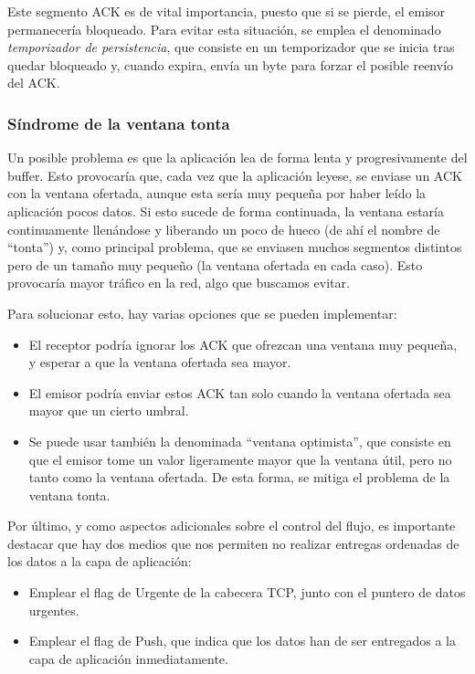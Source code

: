 Este segmento \acrshort{ACK} es de vital importancia, puesto que si se pierde, el emisor permanecería bloqueado. Para evitar esta situación, se emplea el denominado \emph{temporizador de persistencia}, que consiste en un temporizador que se inicia tras quedar bloqueado y, cuando expira, envía un byte para forzar el posible reenvío del \acrshort{ACK}.

\subsubsection{Síndrome de la ventana tonta}

Un posible problema es que la aplicación lea de forma lenta y progresivamente del buffer. Esto provocaría que, cada vez que la aplicación leyese, se enviase un \acrshort{ACK} con la ventana ofertada, aunque esta sería muy pequeña por haber leído la aplicación pocos datos. Si esto sucede de forma continuada, la ventana estaría continuamente llenándose y liberando un poco de hueco (de ahí el nombre de ``tonta'') y, como principal problema, que se enviasen muchos segmentos distintos pero de un tamaño muy pequeño (la ventana ofertada en cada caso). Esto provocaría mayor tráfico en la red, algo que buscamos evitar.

Para solucionar esto, hay varias opciones que se pueden implementar:
\begin{itemize}
    \item El receptor podría ignorar los \acrshort{ACK} que ofrezcan una ventana muy pequeña, y esperar a que la ventana ofertada sea mayor.
    \item El emisor podría enviar estos \acrshort{ACK} tan solo cuando la ventana ofertada sea mayor que un cierto umbral.
    \item Se puede usar también la denominada ``ventana optimista'', que consiste en que el emisor tome un valor ligeramente mayor que la ventana útil, pero no tanto como la ventana ofertada. De esta forma, se mitiga el problema de la ventana tonta.
\end{itemize}

Por último, y como aspectos adicionales sobre el control del flujo, es importante destacar que hay dos medios que nos permiten no realizar entregas ordenadas de los datos a la capa de aplicación:
\begin{itemize}
    \item Emplear el flag de Urgente de la cabecera \acrshort{TCP}, junto con el puntero de datos urgentes.
    \item Emplear el flag de Push, que indica que los datos han de ser entregados a la capa de aplicación inmediatamente.
\end{itemize}

